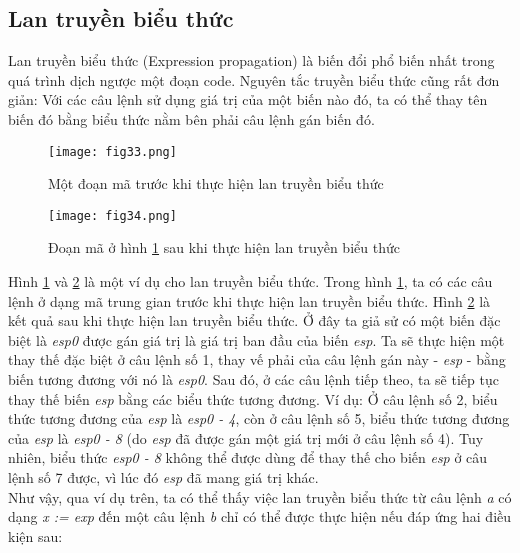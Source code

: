 \subsection{Lan truyền biểu thức}
Lan truyền biểu thức (Expression propagation) là biến đổi phổ biến nhất trong quá trình dịch ngược một đoạn code. Nguyên tắc truyền biểu thức cũng rất đơn giản: Với các câu lệnh sử dụng giá trị của một biến nào đó, ta có thể thay tên biến đó bằng biểu thức nằm bên phải câu lệnh gán biến đó.\\
\begin{figure}[h]
	\centering
	\texttt{[image: fig33.png]}
	\caption{Một đoạn mã trước khi thực hiện lan truyền biểu thức}
	\label{fig:33}
\end{figure}
\begin{figure}[h]
	\centering
	\texttt{[image: fig34.png]}
	\caption{Đoạn mã ở hình \ref{fig:33} sau khi thực hiện lan truyền biểu thức}
	\label{fig:34}
\end{figure}
Hình \ref{fig:33} và \ref{fig:34} là một ví dụ cho lan truyền biểu thức. Trong hình \ref{fig:33}, ta có các câu lệnh ở dạng mã trung gian trước khi thực hiện lan truyền biểu thức. Hình \ref{fig:34} là kết quả sau khi thực hiện lan truyền biểu thức. Ở đây ta giả sử có một biến đặc biệt là \textit{esp0} được gán giá trị là giá trị ban đầu của biến \textit{esp}. Ta sẽ thực hiện một thay thế đặc biệt ở câu lệnh số 1, thay vế phải của câu lệnh gán này - \textit{esp} - bằng biến tương đương với nó là \textit{esp0}. Sau đó, ở các câu lệnh tiếp theo, ta sẽ tiếp tục thay thế biến \textit{esp} bằng các biểu thức tương đương. Ví dụ: Ở câu lệnh số 2, biểu thức tương đương của \textit{esp} là \textit{esp0 - 4}, còn ở câu lệnh số 5, biểu thức tương đương của \textit{esp} là \textit{esp0 - 8} (do \textit{esp} đã được gán một giá trị mới ở câu lệnh số 4). Tuy nhiên, biểu thức \textit{esp0 - 8} không thể được dùng để thay thế cho biến \textit{esp} ở câu lệnh số 7 được, vì lúc đó \textit{esp} đã mang giá trị khác.\\

Như vậy, qua ví dụ trên, ta có thể thấy việc lan truyền biểu thức từ câu lệnh \textit{a} có dạng \textit{x := exp} đến một câu lệnh \textit{b} chỉ có thể được thực hiện nếu đáp ứng hai điều kiện sau:

